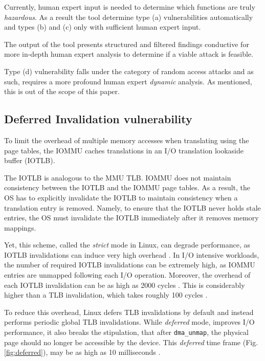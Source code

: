 Currently, human expert input is needed to determine which functions are truly \emph{hazardous}. As a result the tool determine type (a) vulnerabilities automatically and types (b) and (c) only with sufficient human expert input. 

The output of the tool presents structured and filtered findings conductive for more in-depth human expert analysis to determine if a viable attack is feasible. 

Type (d) vulnerability falls under the category of random access attacks and as such, requires a more profound human expert \emph{dynamic} analysis. As mentioned, this is out of the scope of this paper.


\subsection{Deferred Invalidation vulnerability}\label{sec:deferred}

To limit the overhead of multiple memory accesses when translating \iova{} using the page tables, the IOMMU caches translations in an I/O translation lookaside buffer (IOTLB). 

The IOTLB is analogous to the MMU TLB. IOMMU does not maintain consistency between the IOTLB and the IOMMU page tables. As a result, the OS has to explicitly invalidate the IOTLB to maintain consistency when a translation entry is removed. Namely, to ensure that the IOTLB never holds stale entries, the OS must invalidate the IOTLB immediately after it removes memory mappings. 

Yet, this scheme, called the \emph{strict} mode in Linux, can degrade performance, as IOTLB invalidations can induce very high overhead \cite{MMT16,MSMT18,Peleg15}. In I/O intensive workloads, the number of required IOTLB invalidations can be extremely high, as IOMMU entries are unmapped following each I/O operation. Moreover, the overhead of each IOTLB invalidation can be as high as 2000 cycles \cite{ABYTS11}. This is considerably higher than a TLB invalidation, which takes roughly 100 cycles \cite{Han14}. 

To reduce this overhead, Linux defers TLB invalidations by default and instead performs periodic global TLB invalidations. While \emph{deferred} mode, improves I/O performance, it also breaks the stipulation, that after \texttt{dma\_unmap}, the physical page should no longer be accessible by the device. This \emph{deferred} time frame (Fig. \ref{fig:deferred}), may be as high as 10 milliseconds \cite{MSMT18}.


